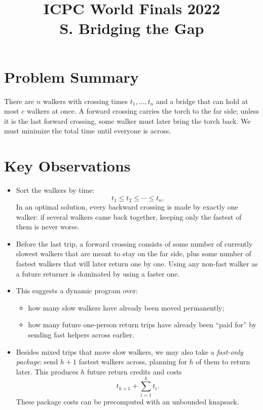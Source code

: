 \documentclass[11pt]{article}
\title{ICPC World Finals 2022\\S. Bridging the Gap}
\author{}
\date{}
\begin{document}
\maketitle

\section*{Problem Summary}

There are $n$ walkers with crossing times $t_1,\dots,t_n$ and a bridge that can hold at most $c$ walkers
at once. A forward crossing carries the torch to the far side; unless it is the last forward crossing, some
walker must later bring the torch back. We must minimize the total time until everyone is across.

\section*{Key Observations}

\begin{itemize}[leftmargin=*]
    \item Sort the walkers by time:
    \[
    t_1 \le t_2 \le \cdots \le t_n.
    \]
    In an optimal solution, every backward crossing is made by exactly one walker: if several walkers came
    back together, keeping only the fastest of them is never worse.
    \item Before the last trip, a forward crossing consists of some number of currently slowest walkers that
    are meant to stay on the far side, plus some number of fastest walkers that will later return one by one.
    Using any non-fast walker as a future returner is dominated by using a faster one.
    \item This suggests a dynamic program over:
    \begin{itemize}[leftmargin=*]
        \item how many slow walkers have already been moved permanently;
        \item how many future one-person return trips have already been ``paid for'' by sending fast helpers
        across earlier.
    \end{itemize}
    \item Besides mixed trips that move slow walkers, we may also take a \emph{fast-only package}: send
    $h+1$ fastest walkers across, planning for $h$ of them to return later. This produces $h$ future return
    credits and costs
    \[
    t_{h+1} + \sum_{i=1}^{h} t_i.
    \]
    These package costs can be precomputed with an unbounded knapsack.
\end{itemize}
\end{document}
